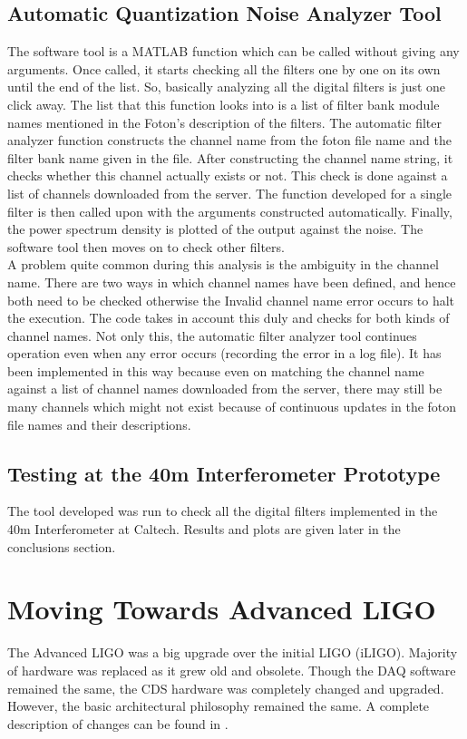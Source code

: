 \documentclass[colorlinks=true,pdfstartview=FitV,linkcolor=blue,
            citecolor=red,urlcolor=magenta]{ligodoc}
\begin{document}
	\subsection{Automatic Quantization Noise Analyzer Tool} The software tool is a MATLAB function which can be called without giving any arguments. Once called, it starts checking all the filters one by one on its own until the end of the list. So, basically analyzing all the digital filters is just one click away. The list that this function looks into is a list of filter bank module names mentioned in the Foton's description of the filters. The automatic filter analyzer function constructs the channel name from the foton file name and the filter bank name given in the file. After constructing the channel name string, it checks whether this channel actually exists or not. This check is done against a list of channels downloaded from the server. The function developed for a single filter is then called upon with the arguments constructed automatically. Finally, the power spectrum density is plotted of the output against the noise. The software tool then moves on to check other filters. \\ A problem quite common during this analysis is the ambiguity in the channel name. There are two ways in which channel names have been defined, and hence both need to be checked otherwise the Invalid channel name error occurs to halt the execution. The code takes in account this duly and checks for both kinds of channel names. Not only this, the automatic filter analyzer tool continues operation even when any error occurs (recording the error in a log file). It has been implemented in this way because even on matching the channel name against a list of channel names downloaded from the server, there may still be many channels which might not exist because of continuous updates in the foton file names and their descriptions.
	\subsection{Testing at the 40m Interferometer Prototype}
	The tool developed was run to check all the digital filters implemented in the 40m Interferometer at Caltech. Results and plots are given later in the conclusions section. 
\section{Moving Towards Advanced LIGO} The Advanced LIGO was a big upgrade over the initial LIGO (iLIGO). Majority of hardware was replaced as it grew old and obsolete. Though the DAQ software remained the same, 	the CDS hardware was completely changed and upgraded. However, the basic architectural philosophy remained the same. A complete description of changes can be found in \cite{upgrade}.
\end{document}
